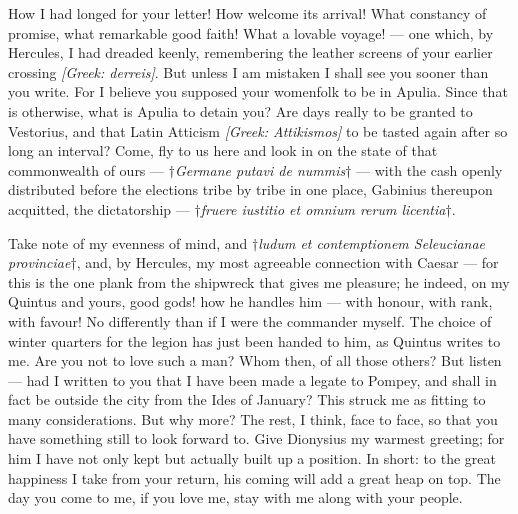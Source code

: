 

 How I had longed for your letter! How welcome its arrival! What constancy of promise, what remarkable good faith! What a lovable voyage! --- one which, by Hercules, I had dreaded keenly, remembering the leather screens of your earlier crossing \textit{[Greek: derreis]}. But unless I am mistaken I shall see you sooner than you write. For I believe you supposed your womenfolk to be in Apulia. Since that is otherwise, what is Apulia to detain you? Are days really to be granted to Vestorius, and that Latin Atticism \textit{[Greek: Attikismos]} to be tasted again after so long an interval? Come, fly to us here and look in on the state of that commonwealth of ours --- \textit{$\dagger$Germane putavi de nummis$\dagger$} --- with the cash openly distributed before the elections tribe by tribe in one place, Gabinius thereupon acquitted, the dictatorship --- \textit{$\dagger$fruere iustitio et omnium rerum licentia$\dagger$}.

 Take note of my evenness of mind, and \textit{$\dagger$ludum et contemptionem Seleucianae provinciae$\dagger$}, and, by Hercules, my most agreeable connection with Caesar --- for this is the one plank from the shipwreck that gives me pleasure; he indeed, on my Quintus and yours, good gods! how he handles him --- with honour, with rank, with favour! No differently than if I were the commander myself. The choice of winter quarters for the legion has just been handed to him, as Quintus writes to me. Are you not to love such a man? Whom then, of all those others? But listen --- had I written to you that I have been made a legate to Pompey, and shall in fact be outside the city from the Ides of January? This struck me as fitting to many considerations. But why more? The rest, I think, face to face, so that you have something still to look forward to. Give Dionysius my warmest greeting; for him I have not only kept but actually built up a position. In short: to the great happiness I take from your return, his coming will add a great heap on top. The day you come to me, if you love me, stay with me along with your people.
